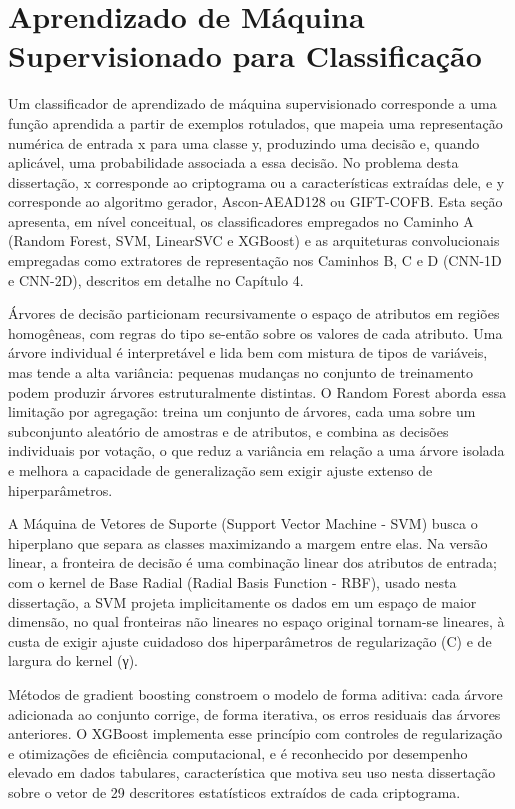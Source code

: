 \section{Aprendizado de Máquina Supervisionado para Classificação}

Um classificador de aprendizado de máquina supervisionado corresponde a uma função aprendida a partir de exemplos rotulados, que mapeia uma representação numérica de entrada x para uma classe y, produzindo uma decisão e, quando aplicável, uma probabilidade associada a essa decisão. No problema desta dissertação, x corresponde ao criptograma ou a características extraídas dele, e y corresponde ao algoritmo gerador, Ascon-AEAD128 ou GIFT-COFB. Esta seção apresenta, em nível conceitual, os classificadores empregados no Caminho A (Random Forest, SVM, LinearSVC e XGBoost) e as arquiteturas convolucionais empregadas como extratores de representação nos Caminhos B, C e D (CNN-1D e CNN-2D), descritos em detalhe no Capítulo 4.

Árvores de decisão particionam recursivamente o espaço de atributos em regiões homogêneas, com regras do tipo se-então sobre os valores de cada atributo. Uma árvore individual é interpretável e lida bem com mistura de tipos de variáveis, mas tende a alta variância: pequenas mudanças no conjunto de treinamento podem produzir árvores estruturalmente distintas. O Random Forest aborda essa limitação por agregação: treina um conjunto de árvores, cada uma sobre um subconjunto aleatório de amostras e de atributos, e combina as decisões individuais por votação, o que reduz a variância em relação a uma árvore isolada e melhora a capacidade de generalização sem exigir ajuste extenso de hiperparâmetros.

A Máquina de Vetores de Suporte (Support Vector Machine - SVM) busca o hiperplano que separa as classes maximizando a margem entre elas. Na versão linear, a fronteira de decisão é uma combinação linear dos atributos de entrada; com o kernel de Base Radial (Radial Basis Function - RBF), usado nesta dissertação, a SVM projeta implicitamente os dados em um espaço de maior dimensão, no qual fronteiras não lineares no espaço original tornam-se lineares, à custa de exigir ajuste cuidadoso dos hiperparâmetros de regularização (C) e de largura do kernel (γ).

Métodos de gradient boosting constroem o modelo de forma aditiva: cada árvore adicionada ao conjunto corrige, de forma iterativa, os erros residuais das árvores anteriores. O XGBoost implementa esse princípio com controles de regularização e otimizações de eficiência computacional, e é reconhecido por desempenho elevado em dados tabulares, característica que motiva seu uso nesta dissertação sobre o vetor de 29 descritores estatísticos extraídos de cada criptograma.


